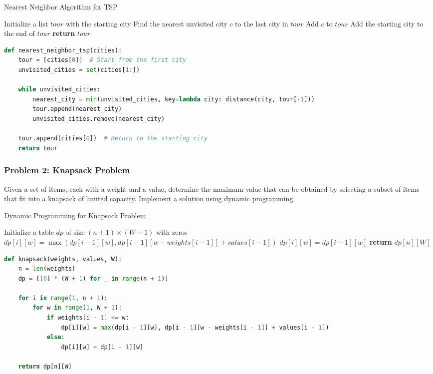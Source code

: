 \documentclass[12pt]{book} %
\begin{document}
\begin{algorithm}
\caption{Nearest Neighbor Algorithm for TSP}
\begin{algorithmic}[1]
\State Initialize a list $tour$ with the starting city
\State Find the nearest unvisited city $c$ to the last city in $tour$
\State Add $c$ to $tour$
\EndWhile
\State Add the starting city to the end of $tour$
\State \textbf{return} $tour$
\end{algorithmic}
\end{algorithm}

\FloatBarrier
\begin{lstlisting}[language=Python]
def nearest_neighbor_tsp(cities):
    tour = [cities[0]]  # Start from the first city
    unvisited_cities = set(cities[1:])
    
    while unvisited_cities:
        nearest_city = min(unvisited_cities, key=lambda city: distance(city, tour[-1]))
        tour.append(nearest_city)
        unvisited_cities.remove(nearest_city)
    
    tour.append(cities[0])  # Return to the starting city
    return tour
\end{lstlisting}
\FloatBarrier

\subsubsection*{Problem 2: Knapsack Problem}

Given a set of items, each with a weight and a value, determine the maximum value that can be obtained by selecting a subset of items that fit into a knapsack of limited capacity. Implement a solution using dynamic programming.

\begin{algorithm}
\caption{Dynamic Programming for Knapsack Problem}
\begin{algorithmic}[1]
\State Initialize a table $dp$ of size $(n+1) \times (W+1)$ with zeros
\State $dp[i][w] = \max(dp[i-1][w], dp[i-1][w-weights[i-1]] + values[i-1])$
\Else
\State $dp[i][w] = dp[i-1][w]$
\EndIf
\EndFor
\EndFor
\State \textbf{return} $dp[n][W]$
\end{algorithmic}
\end{algorithm}

\FloatBarrier
\begin{lstlisting}[language=Python]
def knapsack(weights, values, W):
    n = len(weights)
    dp = [[0] * (W + 1) for _ in range(n + 1)]
    
    for i in range(1, n + 1):
        for w in range(1, W + 1):
            if weights[i - 1] <= w:
                dp[i][w] = max(dp[i - 1][w], dp[i - 1][w - weights[i - 1]] + values[i - 1])
            else:
                dp[i][w] = dp[i - 1][w]
    
    return dp[n][W]
\end{lstlisting}
\FloatBarrier
\end{document}
